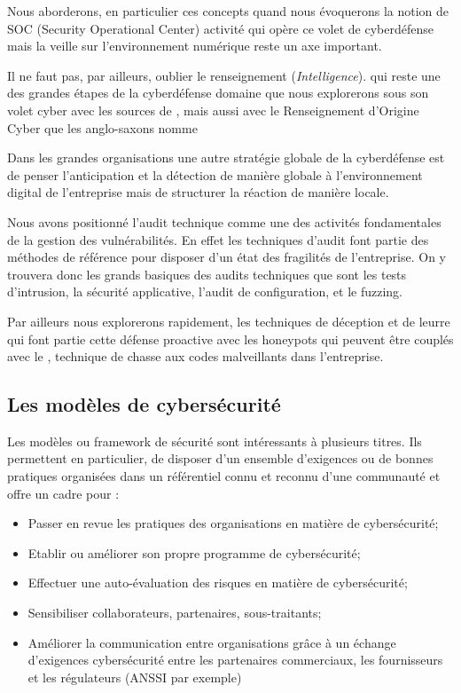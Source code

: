 Nous aborderons, en particulier ces concepts quand nous évoquerons la notion de SOC (Security Operational Center) activité qui opère ce volet de cyberdéfense mais la veille sur l'environnement numérique reste un axe important.




Il ne faut pas, par ailleurs, oublier le renseignement (\textit{Intelligence}). qui reste une des grandes étapes de la cyberdéfense domaine que nous explorerons sous son volet cyber avec les sources de , mais aussi avec le Renseignement d'Origine Cyber que les anglo-saxons nomme 

Dans les grandes organisations une autre stratégie globale de la cyberdéfense est de penser l'anticipation et la détection de manière globale à l'environnement digital de l'entreprise mais de structurer la réaction de manière locale. 


Nous avons positionné l'audit technique comme une des activités fondamentales de la gestion des vulnérabilités.
En effet les techniques d'audit font partie des méthodes de référence pour disposer d'un état des fragilités de l'entreprise. On y trouvera donc les grands basiques des audits techniques que sont les tests d'intrusion, la sécurité applicative, l'audit de configuration, et le fuzzing.

Par ailleurs nous explorerons rapidement, les techniques de déception et de leurre qui font partie cette défense proactive avec les honeypots qui peuvent être couplés avec le , technique de chasse aux codes malveillants dans l'entreprise.
 

\subsection{Les modèles de cybersécurité}

Les modèles ou framework de sécurité sont intéressants à plusieurs titres. Ils permettent en particulier, de disposer d'un ensemble d'exigences ou de bonnes pratiques organisées dans un référentiel connu et reconnu d'une communauté et  offre un cadre pour : 

\begin{itemize}
  \item Passer en revue les pratiques des organisations en matière de cybersécurité;
  \item Etablir ou améliorer son propre programme de cybersécurité;
  \item Effectuer une auto-évaluation des risques en matière de cybersécurité;
  \item Sensibiliser collaborateurs, partenaires, sous-traitants;
  \item Améliorer la communication entre organisations grâce à un échange d’exigences cybersécurité entre les partenaires commerciaux, les fournisseurs et les régulateurs (ANSSI par exemple)
\end{itemize}


